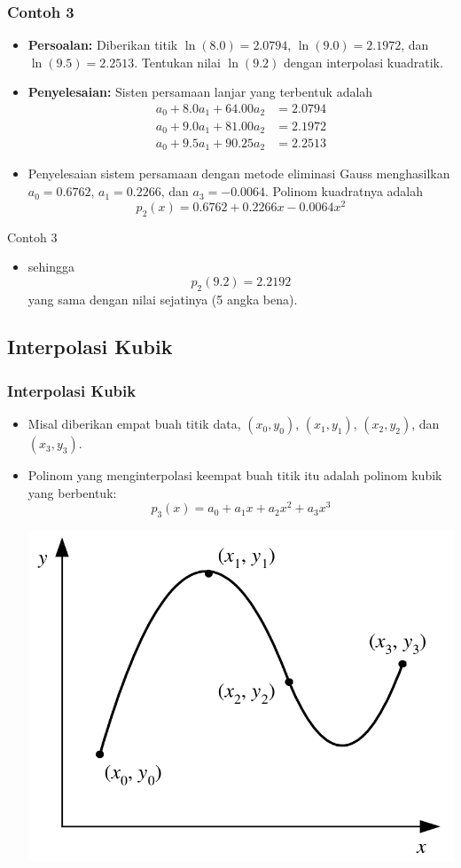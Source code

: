 \documentclass[pdflatex,compress,mathserif]{beamer}
\begin{document}
\begin{frame}
	\frametitle{Contoh 3}
	\begin{itemize}
		\item \textbf{Persoalan:} Diberikan titik $ \ln(8.0) = 2.0794 $, $ \ln(9.0) = 2.1972 $, dan $ \ln(9.5) = 2.2513 $. Tentukan nilai $ \ln(9.2) $ dengan interpolasi kuadratik.
		\item \textbf{Penyelesaian:} Sisten persamaan lanjar yang terbentuk adalah
		\begin{align*}
		a_0 + 8.0 a_1 + 64.00 a_2 &= 2.0794\\
		a_0 + 9.0 a_1 + 81.00 a_2 &= 2.1972\\
		a_0 + 9.5 a_1 + 90.25 a_2 &= 2.2513
		\end{align*}
		\item Penyelesaian sistem persamaan dengan metode eliminasi Gauss menghasilkan $ a_0 = 0.6762 $, $ a_1 = 0.2266 $, dan $ a_3 = -0.0064 $. Polinom
		kuadratnya adalah
		\[ p_2(x) = 0.6762 + 0.2266x - 0.0064x^2 \]
	\end{itemize}
\end{frame}

\begin{frame}{Contoh 3}
	\begin{itemize}
		\item sehingga \[ p_2(9.2) = 2.2192 \] yang sama dengan nilai sejatinya (5 angka bena).
	\end{itemize}
\end{frame}

\subsection{Interpolasi Kubik}

\begin{frame}
	\frametitle{Interpolasi Kubik}
	\begin{itemize}
		\item Misal diberikan empat buah titik data, $ (x_0, y_0) $, $ (x_1, y_1) $, $ (x_2, y_2) $,
		dan $ (x_3 , y_3) $.
		\item Polinom yang menginterpolasi keempat buah titik itu adalah polinom kubik yang berbentuk:
		\begin{equation}\label{int.kub}
			p_3(x) = a_0 + a_1x + a_2 x^2 + a_3 x^3
		\end{equation}
		\begin{center}
			\includegraphics[width=0.4\linewidth]{img/img07}
		\end{center}
	\end{itemize}
\end{frame}
\end{document}
